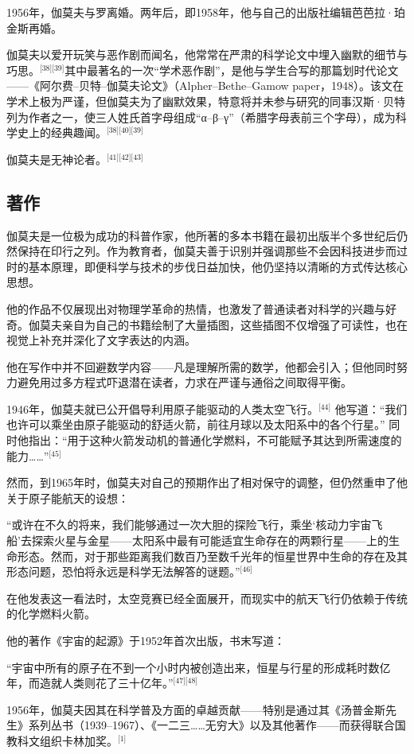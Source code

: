 1956年，伽莫夫与罗离婚。两年后，即1958年，他与自己的出版社编辑芭芭拉·珀金斯再婚。

伽莫夫以爱开玩笑与恶作剧而闻名，他常常在严肃的科学论文中埋入幽默的细节与巧思。\(^\text{[38][39]}\)其中最著名的一次“学术恶作剧”，是他与学生合写的那篇划时代论文——《阿尔费–贝特–伽莫夫论文》（Alpher–Bethe–Gamow paper，1948）。该文在学术上极为严谨，但伽莫夫为了幽默效果，特意将并未参与研究的同事汉斯·贝特列为作者之一，使三人姓氏首字母组成“α–β–γ”（希腊字母表前三个字母），成为科学史上的经典趣闻。\(^\text{[38][40][39]}\)

伽莫夫是无神论者。\(^\text{[41][42][43]}\)
\subsection{著作}
伽莫夫是一位极为成功的科普作家，他所著的多本书籍在最初出版半个多世纪后仍然保持在印行之列。作为教育者，伽莫夫善于识别并强调那些不会因科技进步而过时的基本原理，即便科学与技术的步伐日益加快，他仍坚持以清晰的方式传达核心思想。

他的作品不仅展现出对物理学革命的热情，也激发了普通读者对科学的兴趣与好奇。伽莫夫亲自为自己的书籍绘制了大量插图，这些插图不仅增强了可读性，也在视觉上补充并深化了文字表达的内涵。

他在写作中并不回避数学内容——凡是理解所需的数学，他都会引入；但他同时努力避免用过多方程式吓退潜在读者，力求在严谨与通俗之间取得平衡。

1946年，伽莫夫就已公开倡导利用原子能驱动的人类太空飞行。\(^\text{[44]}\)
他写道：“我们也许可以乘坐由原子能驱动的舒适火箭，前往月球以及太阳系中的各个行星。”
同时他指出：“用于这种火箭发动机的普通化学燃料，不可能赋予其达到所需速度的能力……”\(^\text{[45]}\)

然而，到1965年时，伽莫夫对自己的预期作出了相对保守的调整，但仍然重申了他关于原子能航天的设想：

“或许在不久的将来，我们能够通过一次大胆的探险飞行，乘坐‘核动力宇宙飞船’去探索火星与金星——太阳系中最有可能适宜生命存在的两颗行星——上的生命形态。然而，对于那些距离我们数百乃至数千光年的恒星世界中生命的存在及其形态问题，恐怕将永远是科学无法解答的谜题。”\(^\text{[46]}\)

在他发表这一看法时，太空竞赛已经全面展开，而现实中的航天飞行仍依赖于传统的化学燃料火箭。

他的著作《宇宙的起源》于1952年首次出版，书末写道：

“宇宙中所有的原子在不到一个小时内被创造出来，恒星与行星的形成耗时数亿年，而造就人类则花了三十亿年。”\(^\text{[47][48]}\)

1956年，伽莫夫因其在科学普及方面的卓越贡献——特别是通过其《汤普金斯先生》系列丛书（1939–1967）、《一二三……无穷大》以及其他著作——而获得联合国教科文组织卡林加奖。\(^\text{[1]}\)

